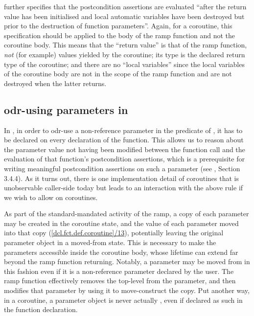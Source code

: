 \cite{P2900R8} further specifies that the postcondition assertions are evaluated ``after the return value has been initialised and local automatic variables have been destroyed but prior to the destruction of function parameters''. Again, for a coroutine, this specification should be applied to the body of the ramp function and not the coroutine body. This means that the ``return value'' is that of the ramp function, \emph{not} (for example) values yielded by the coroutine; its type is the declared return type of the coroutine; and there are no ``local variables'' since the local variables of the coroutine body are not in the scope of the ramp function and are not destroyed when the latter returns.

\subsection{odr-using parameters in }
\label{paramsinpost}

In \cite{P2900R8}, in order to odr-use a non-reference parameter in the predicate of , it has to be declared  on every declaration of the function. This allows us to reason about the parameter value not having been modified between the function call and the evaluation of that function's postcondition assertions, which is a prerequisite for writing meaningful postcondition assertions on such a parameter (see \cite{P2900R8}, Section 3.4.4). As it turns out, there is one implementation detail of coroutines that is unobservable caller-side today but leads to an interaction with the above rule if we wish to allow  on coroutines.

As part of the standard-mandated activity of the ramp, a copy of each parameter may be created in the coroutine state, and the value of each parameter moved into that copy (\href{https://eel.is/c++draft/dcl.fct.def.coroutine#13}{[dcl.fct.def.coroutine]/13}), potentially leaving the original parameter object in a moved-from state. This is necessary to make the parameters accessible inside the coroutine body, whose lifetime can extend far beyond the ramp function returning. Notably, a parameter may be moved from in this fashion even if it is a non-reference parameter declared  by the user. The ramp function effectively removes the top-level  from the parameter, and then modifies that parameter by using it to move-construct the copy. Put another way, in a coroutine, a parameter object is never actually , even if declared as such in the function declaration.

